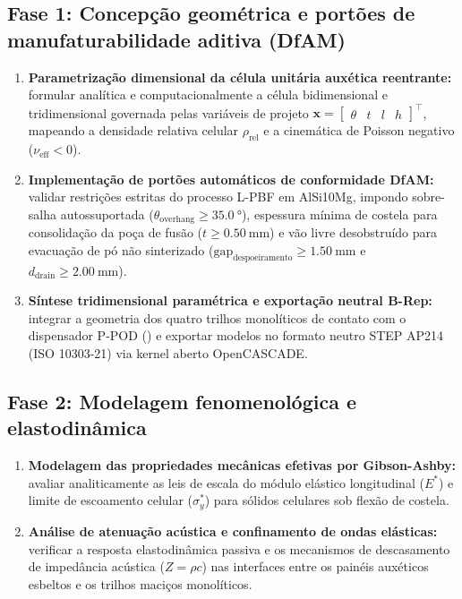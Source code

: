 \subsection*{Fase 1: Concepção geométrica e portões de manufaturabilidade aditiva (DfAM)}
\begin{enumerate}
  \item \textbf{Parametrização dimensional da célula unitária auxética reentrante:} formular analítica e computacionalmente a célula bidimensional e tridimensional governada pelas variáveis de projeto $\mathbf{x} = \begin{bmatrix} \theta & t & l & h \end{bmatrix}^{\top}$, mapeando a densidade relativa celular $\rho_{\text{rel}}$ e a cinemática de Poisson negativo ($\nu_{\text{eff}} < 0$).
  \item \textbf{Implementação de portões automáticos de conformidade DfAM:} validar restrições estritas do processo L-PBF em AlSi10Mg, impondo sobre-salha autossuportada ($\theta_{\text{overhang}} \ge \SI{35.0}{\degree}$), espessura mínima de costela para consolidação da poça de fusão ($t \ge \SI{0.50}{\milli\metre}$) e vão livre desobstruído para evacuação de pó não sinterizado ($\text{gap}_{\text{despoeiramento}} \ge \SI{1.50}{\milli\metre}$ e $d_{\text{drain}} \ge \SI{2.00}{\milli\metre}$).
  \item \textbf{Síntese tridimensional paramétrica e exportação neutral B-Rep:} integrar a geometria dos quatro trilhos monolíticos de contato com o dispensador P-POD (\rail{}) e exportar modelos no formato neutro STEP AP214 (ISO 10303-21) via kernel aberto OpenCASCADE.
\end{enumerate}

\subsection*{Fase 2: Modelagem fenomenológica e elastodinâmica}
\begin{enumerate}[resume]
  \item \textbf{Modelagem das propriedades mecânicas efetivas por Gibson-Ashby:} avaliar analiticamente as leis de escala do módulo elástico longitudinal ($E^*$) e limite de escoamento celular ($\sigma_y^*$) para sólidos celulares sob flexão de costela.
  \item \textbf{Análise de atenuação acústica e confinamento de ondas elásticas:} verificar a resposta elastodinâmica passiva e os mecanismos de descasamento de impedância acústica ($Z = \rho c$) nas interfaces entre os painéis auxéticos esbeltos e os trilhos maciços monolíticos.
\end{enumerate}

